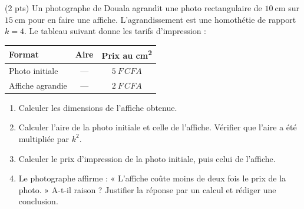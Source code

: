 \documentclass[11pt]{article}
\begin{document}
\begin{exercice} \hfill (2 pts)
Un photographe de Douala agrandit une photo rectangulaire de $\SI{10}{\centi\metre}$ sur $\SI{15}{\centi\metre}$ pour en faire une affiche. L'agrandissement est une homothétie de rapport $k = 4$. Le tableau suivant donne les tarifs d'impression :

\begin{center}
\begin{tabular}{|l|c|c|}
\hline
\textbf{Format} & \textbf{Aire} & \textbf{Prix au \si{\centi\metre\squared}} \\
\hline
Photo initiale & --- & $\SI{5}{F\,CFA}$ \\
\hline
Affiche agrandie & --- & $\SI{2}{F\,CFA}$ \\
\hline
\end{tabular}
\end{center}

\begin{enumerate}
\item Calculer les dimensions de l'affiche obtenue.
\item Calculer l'aire de la photo initiale et celle de l'affiche. Vérifier que l'aire a été multipliée par $k^2$.
\item Calculer le prix d'impression de la photo initiale, puis celui de l'affiche.
\item Le photographe affirme : « L'affiche coûte moins de deux fois le prix de la photo. » A-t-il raison ? Justifier la réponse par un calcul et rédiger une conclusion.
\end{enumerate}
\end{exercice}
\end{document}
